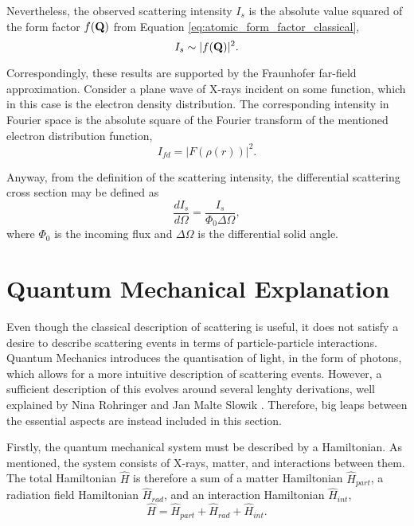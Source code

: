 Nevertheless, the observed scattering intensity $I_{s}$ is the absolute value squared of the form factor $f(\bm{\mathrm{Q}})$ from Equation \eqref{eq:atomic_form_factor_classical},
\begin{equation}\label{eq:scattering_intensity_classical}
    I_{s} \sim |f(\bm{\mathrm{Q}})|^{2}.
\end{equation}

Correspondingly, these results are supported by the Fraunhofer far-field approximation. Consider a plane wave of X-rays incident on some function, which in this case is the electron density distribution.
The corresponding intensity in Fourier space is the absolute square of the Fourier transform of the mentioned electron distribution function,
\begin{equation}\label{eq:Fraunhofer_intensity}
    I_{fd} = |F\left(\rho(r) \right) |^{2}.
\end{equation}

Anyway, from the definition of the scattering intensity, the differential scattering cross section may be defined as
\begin{equation}\label{eq:scattering_crossection}
    \frac{dI_{s}}{d\Omega} = \frac{I_{s}}{\Phi_{0} \Delta\Omega},
\end{equation}
where $\Phi_{0}$ is the incoming flux and $\Delta\Omega$ is the differential solid angle.



\section{Quantum Mechanical Explanation}\label{sec:quantum_scattering}

Even though the classical description of scattering is useful, it does not satisfy a desire to describe scattering events in terms of particle-particle interactions.
Quantum Mechanics introduces the quantisation of light, in the form of photons, which allows for a more intuitive description of scattering events.
However, a sufficient description of this evolves around several lenghty derivations, well explained by Nina Rohringer \cite{rohringer2020introduction} and Jan Malte Slowik \cite{slowik2015quantum}.
Therefore, big leaps between the essential aspects are instead included in this section.

Firstly, the quantum mechanical system must be described by a Hamiltonian. As mentioned, the system consists of X-rays, matter, and interactions between them.
The total Hamiltonian $\hat{H}$ is therefore a sum of a matter Hamiltonian $\hat{H}_{part}$, a radiation field Hamiltonian $\hat{H}_{rad}$, and an interaction Hamiltonian $\hat{H}_{int}$,
\begin{equation}\label{eq:total_Hamiltonian}
    \hat{H} = \hat{H}_{part} + \hat{H}_{rad} + \hat{H}_{int}.
\end{equation}

